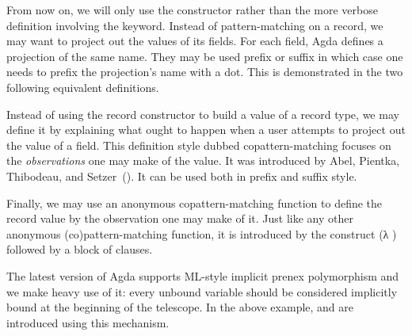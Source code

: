From now on, we will only use the constructor \AIC{\_,\_} rather than the
more verbose definition involving the  keyword. Instead of
pattern-matching on a record, we may want to project out the values of
its fields. For each field, Agda defines a projection of the same name.
They may be used prefix or suffix in which case one needs to prefix the
projection's name with a dot. This is demonstrated in the two following
equivalent definitions.

\begin{minipage}[t]{0.5\textwidth}
\end{minipage}\begin{minipage}[t]{0.5\textwidth}
\end{minipage}

Instead of using the record constructor to build a value of a record type,
we may define it by explaining what ought to happen when a user attempts
to project out the value of a field. This definition style dubbed
copattern-matching focuses on the \emph{observations} one may make of the
value. It was introduced by Abel, Pientka, Thibodeau,
and Setzer~(\citeyear{abelPientkaThibodeauSetzer:popl13}).
It can be used both in prefix and suffix style.

\begin{minipage}[t]{0.5\textwidth}
\end{minipage}\begin{minipage}[t]{0.5\textwidth}
\end{minipage}

Finally, we may use an anonymous copattern-matching function to define
the record value by the observation one may make of it. Just like any
other anonymous (co)pattern-matching function, it is introduced by the
construct {(λ )} followed by a block of clauses.



\begin{feature} The latest version of Agda supports ML-style
implicit prenex polymorphism and we make heavy use of it: every unbound variable
should be considered implicitly bound at the beginning of the telescope. In the above
example,  and  are introduced using this mechanism.
\end{feature}

